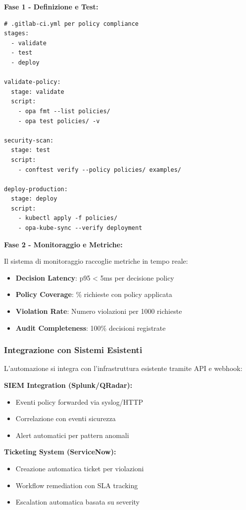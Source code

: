 \textbf{Fase 1 - Definizione e Test:}
\begin{lstlisting}[caption={Pipeline CI/CD per Policy Compliance},label={lst:cicd_policy}]
# .gitlab-ci.yml per policy compliance
stages:
  - validate
  - test
  - deploy

validate-policy:
  stage: validate
  script:
    - opa fmt --list policies/
    - opa test policies/ -v
    
security-scan:
  stage: test
  script:
    - conftest verify --policy policies/ examples/
    
deploy-production:
  stage: deploy
  script:
    - kubectl apply -f policies/
    - opa-kube-sync --verify deployment
\end{lstlisting}

\textbf{Fase 2 - Monitoraggio e Metriche:}

Il sistema di monitoraggio raccoglie metriche in tempo reale:
\begin{itemize}
    \item \textbf{Decision Latency}: p95 < 5ms per decisione policy
    \item \textbf{Policy Coverage}: \% richieste con policy applicata
    \item \textbf{Violation Rate}: Numero violazioni per 1000 richieste
    \item \textbf{Audit Completeness}: 100\% decisioni registrate
\end{itemize}

\subsubsection{Integrazione con Sistemi Esistenti}

L'automazione si integra con l'infrastruttura esistente tramite API e webhook:

\textbf{SIEM Integration (Splunk/QRadar):}
\begin{itemize}
    \item Eventi policy forwarded via syslog/HTTP
    \item Correlazione con eventi sicurezza
    \item Alert automatici per pattern anomali
\end{itemize}

\textbf{Ticketing System (ServiceNow):}
\begin{itemize}
    \item Creazione automatica ticket per violazioni
    \item Workflow remediation con SLA tracking
    \item Escalation automatica basata su severity
\end{itemize}

